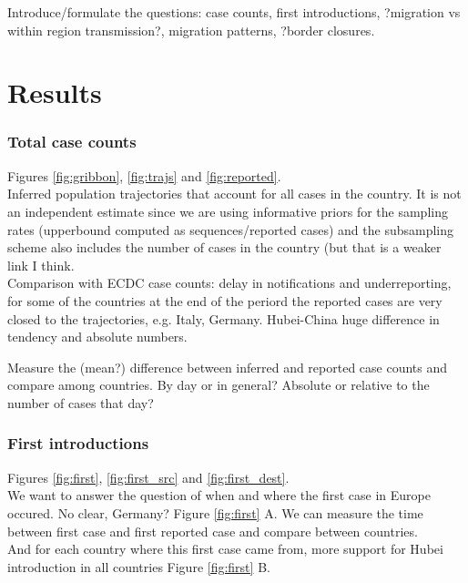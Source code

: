 \documentclass[12pt,]{article}
\begin{document}
\item Introduce/formulate the questions: case counts, first introductions, ?migration vs within region transmission?, migration patterns, ?border closures.


\section*{Results}

\subsubsection*{Total case counts}

Figures \ref{fig:gribbon}, \ref{fig:trajs} and \ref{fig:reported}.\\


Inferred population trajectories that account for all cases in the country. It is not an independent estimate since we are using informative priors for the sampling rates (upperbound computed as sequences/reported cases) and the subsampling scheme also includes the number of cases in the country (but that is a weaker link I think.\\


Comparison with ECDC case counts: delay in notifications and underreporting, for some of the  countries at the end of the periord the reported cases are very closed to the trajectories, e.g. Italy, Germany. Hubei-China huge difference in tendency and absolute numbers.\\ 

Measure the (mean?) difference between inferred and reported case counts and compare among countries. By day or in general? Absolute or relative to the number of cases that day?


\subsubsection*{First introductions}
Figures \ref{fig:first}, \ref{fig:first_src} and \ref{fig:first_dest}.\\


We want to answer the question of when and where the first case in Europe occured. No clear, Germany? Figure \ref{fig:first} A. We can measure the time between first case and first reported case and compare between countries. \\
And for each country where this first case came from, more support for Hubei introduction in all countries Figure \ref{fig:first} B.\\
\end{document}
